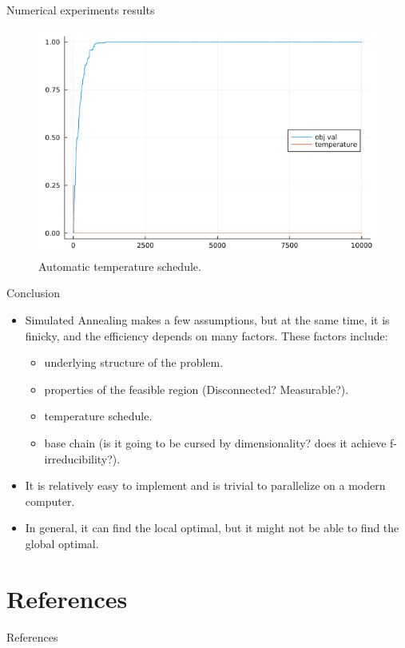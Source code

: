 \documentclass[11pt]{beamer}
\begin{document}
    \begin{frame}{Numerical experiments results}
        \begin{figure}
            \centering
            \includegraphics[scale=0.4]{sa_experiment3.png}
            \caption{Automatic temperature schedule. }
        \end{figure}
    \end{frame}
    \begin{frame}{Conclusion}
        \begin{itemize}
            \item Simulated Annealing makes a few assumptions, but at the same time, it is finicky, and the efficiency depends on many factors. These factors include: 
                \begin{itemize}
                    \item underlying structure of the problem. 
                    \item properties of the feasible region (Disconnected? Measurable?).
                    \item temperature schedule. 
                    \item base chain (is it going to be cursed by dimensionality? does it achieve f-irreducibility?). 
                \end{itemize}
            \item It is relatively easy to implement and is trivial to parallelize on a modern computer. 
            \item In general, it can find the local optimal, but it might not be able to find the global optimal. 
        \end{itemize}
    \end{frame}

\section{References}
    \begin{frame}{References}
        
    \end{frame}
\end{document}
